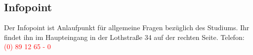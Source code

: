 \subsection{Infopoint}
Der Infopoint ist Anlaufpunkt für allgemeine Fragen bezüglich des 
Studiums. Ihr findet ihn im Haupteingang in der Lothstraße 34 auf der 
rechten Seite. Telefon: \textcolor{red}{(0) 89 12 65 - 0}